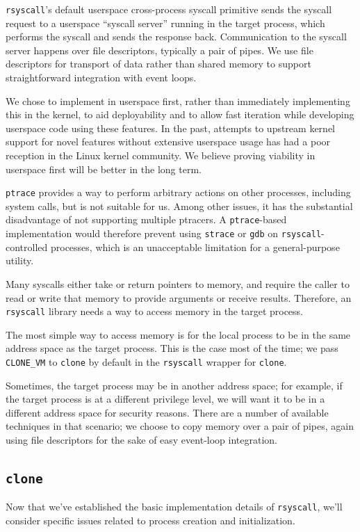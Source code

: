\documentclass[letterpaper,twocolumn,10pt]{article}
\begin{document}
\texttt{rsyscall}'s default userspace cross-process syscall primitive sends the syscall request
to a userspace ``syscall server'' running in the target process,
which performs the syscall and sends the response back.
Communication to the syscall server happens over file descriptors,
typically a pair of pipes.
We use file descriptors for transport of data rather than shared memory
to support straightforward integration with event loops.

We chose to implement in userspace first,
rather than immediately implementing this in the kernel,
to aid deployability
and to allow fast iteration while developing userspace code using these features.
In the past, attempts to upstream kernel support for novel features without extensive userspace usage
has had a poor reception in the Linux kernel community.\cite{lwn_checkpoint}\cite{first_class_address_space}
We believe proving viability in userspace first will be better in the long term.

\texttt{ptrace} provides a way to perform arbitrary actions on other processes,
including system calls,
but is not suitable for us.\cite{ptrace}
Among other issues, it has the substantial disadvantage of not supporting multiple ptracers.
A \texttt{ptrace}-based implementation would therefore prevent
using \texttt{strace} or \texttt{gdb} on \texttt{rsyscall}-controlled processes,
which is an unacceptable limitation for a general-purpose utility.

Many syscalls either take or return pointers to memory,
and require the caller to read or write that memory to provide arguments or receive results.
Therefore, an \texttt{rsyscall} library needs a way to access memory in the target process.

The most simple way to access memory is for the local process to be in the same address space as the target process.
This is the case most of the time; we pass \verb|CLONE_VM| to \texttt{clone} by default
in the \texttt{rsyscall} wrapper for \texttt{clone}.

Sometimes, the target process may be in another address space;
for example, if the target process is at a different privilege level,
we will want it to be in a different address space for security reasons.\cite{vfork_dangerous}
There are a number of available techniques in that scenario;
we choose to copy memory over a pair of pipes,
again using file descriptors for the sake of easy event-loop integration.
\subsection{\texttt{clone}}\label{clone}
Now that we've established the basic implementation details of \texttt{rsyscall},
we'll consider specific issues related to process creation and initialization.
\end{document}
